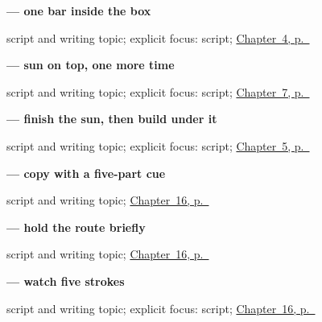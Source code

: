 \noindent\begin{minipage}[t]{\linewidth}
\raggedright
\textbf{ — one bar inside the box}\par
\footnotesize script and writing topic; explicit focus: script; \hyperref[ch:zh-negation]{Chapter~4, p.~\pageref*{ch:zh-negation}}
\end{minipage}\par\smallskip

\noindent\begin{minipage}[t]{\linewidth}
\raggedright
\textbf{ — sun on top, one more time}\par
\footnotesize script and writing topic; explicit focus: script; \hyperref[ch:zh-zaoshang]{Chapter~7, p.~\pageref*{ch:zh-zaoshang}}
\end{minipage}\par\smallskip

\noindent\begin{minipage}[t]{\linewidth}
\raggedright
\textbf{ — finish the sun, then build under it}\par
\footnotesize script and writing topic; explicit focus: script; \hyperref[ch:zh-shi]{Chapter~5, p.~\pageref*{ch:zh-shi}}
\end{minipage}\par\smallskip

\noindent\begin{minipage}[t]{\linewidth}
\raggedright
\textbf{ — copy with a five-part cue}\par
\footnotesize script and writing topic; \hyperref[ch:zh-language-identity]{Chapter~16, p.~\pageref*{ch:zh-language-identity}}
\end{minipage}\par\smallskip

\noindent\begin{minipage}[t]{\linewidth}
\raggedright
\textbf{ — hold the route briefly}\par
\footnotesize script and writing topic; \hyperref[ch:zh-language-identity]{Chapter~16, p.~\pageref*{ch:zh-language-identity}}
\end{minipage}\par\smallskip

\noindent\begin{minipage}[t]{\linewidth}
\raggedright
\textbf{ — watch five strokes}\par
\footnotesize script and writing topic; explicit focus: script; \hyperref[ch:zh-language-identity]{Chapter~16, p.~\pageref*{ch:zh-language-identity}}
\end{minipage}\par\smallskip

